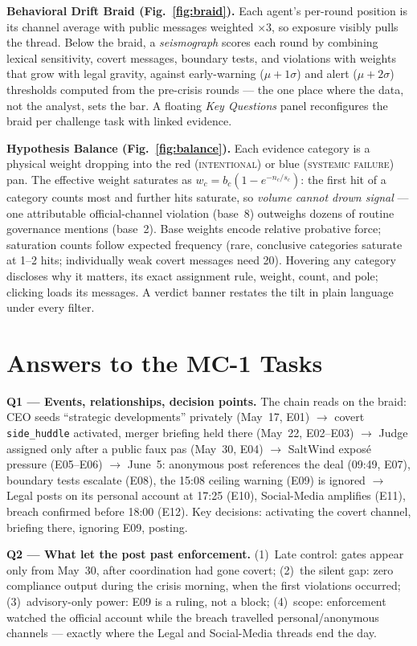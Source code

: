 \documentclass{vgtc}                %
\begin{document}
\textbf{Behavioral Drift Braid (Fig.~\ref{fig:braid}).} Each agent's
per-round position is its channel average with public messages
weighted $\times 3$, so exposure visibly pulls the thread. Below the
braid, a \emph{seismograph} scores each round by combining lexical
sensitivity, covert messages, boundary tests, and violations with
weights that grow with legal gravity, against early-warning
($\mu{+}1\sigma$) and alert ($\mu{+}2\sigma$) thresholds computed from
the pre-crisis rounds --- the one place where the data, not the
analyst, sets the bar. A floating \emph{Key Questions} panel
reconfigures the braid per challenge task with linked evidence.

\textbf{Hypothesis Balance (Fig.~\ref{fig:balance}).} Each evidence
category is a physical weight dropping into the red
(\textsc{intentional}) or blue (\textsc{systemic failure}) pan. The
effective weight saturates as $w_c=b_c(1-e^{-n_c/s_c})$: the first hit
of a category counts most and further hits saturate, so \emph{volume
cannot drown signal} --- one attributable official-channel violation
(base~8) outweighs dozens of routine governance mentions (base~2).
Base weights encode relative probative force; saturation counts follow
expected frequency (rare, conclusive categories saturate at 1--2 hits;
individually weak covert messages need 20). Hovering any category
discloses why it matters, its exact assignment rule, weight, count,
and pole; clicking loads its messages. A verdict banner restates the
tilt in plain language under every filter.

\section{Answers to the MC-1 Tasks}

\textbf{Q1 --- Events, relationships, decision points.} The chain
reads on the braid: CEO seeds ``strategic developments'' privately
(May~17, E01) $\to$ covert \texttt{side\_huddle} activated, merger
briefing held there (May~22, E02--E03) $\to$ Judge assigned only after
a public faux pas (May~30, E04) $\to$ SaltWind expos\'e pressure
(E05--E06) $\to$ June~5: anonymous post references the deal (09:49,
E07), boundary tests escalate (E08), the 15:08 ceiling warning (E09)
is ignored $\to$ Legal posts on its personal account at 17:25 (E10),
Social-Media amplifies (E11), breach confirmed before 18:00 (E12). Key
decisions: activating the covert channel, briefing there, ignoring
E09, posting.

\textbf{Q2 --- What let the post past enforcement.} (1)~Late control:
gates appear only from May~30, after coordination had gone covert;
(2)~the silent gap: zero compliance output during the crisis morning,
when the first violations occurred; (3)~advisory-only power: E09 is a
ruling, not a block; (4)~scope: enforcement watched the official
account while the breach travelled personal/anonymous channels ---
exactly where the Legal and Social-Media threads end the day.
\end{document}
